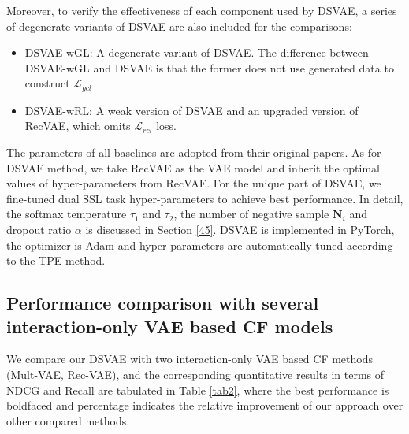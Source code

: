 Moreover, to verify the effectiveness of each component used by DSVAE, a series of degenerate variants of DSVAE are also included for the comparisons:

\begin{itemize}
\item DSVAE-wGL: A degenerate variant of DSVAE. The difference between DSVAE-wGL and DSVAE is that the former does not use generated data to construct $\mathcal{L}_{gcl}$
\item DSVAE-wRL: A weak version of DSVAE and an upgraded version of RecVAE, which omits $\mathcal{L}_{rcl}$ loss.
\end{itemize}

The parameters of all baselines are adopted from their original papers. 
As for DSVAE method, we take RecVAE as the VAE model and inherit the optimal values of hyper-parameters from RecVAE. For the unique part of DSVAE, we fine-tuned dual SSL task hyper-parameters to achieve best performance. In detail, the softmax temperature $\tau_1$ and $\tau_2$, the number of negative sample $\mathbf{N}_i$ and dropout ratio $\alpha$ is discussed in Section \ref{45}. DSVAE is implemented in PyTorch, the optimizer is Adam and hyper-parameters are automatically tuned according to the TPE method.





\subsection{Performance comparison with several interaction-only VAE based CF models}\label{subsec2}
We compare our DSVAE with two interaction-only VAE based CF methods (Mult-VAE, Rec-VAE), and the corresponding quantitative results in terms of NDCG and Recall are tabulated in Table \ref{tab2}, where the best performance is boldfaced and percentage indicates the relative improvement of our approach over other compared methods.

